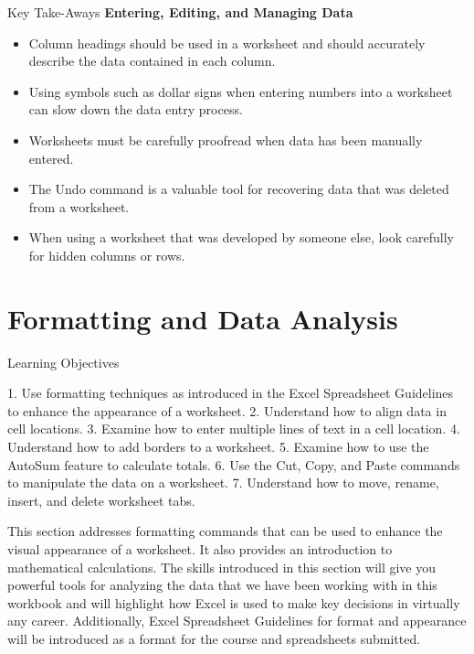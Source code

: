 \begin{center}
	\begin{tkwbox}{Key Take-Aways}
		\textbf{Entering, Editing, and Managing Data}
		\\
		\begin{itemize}
			\setlength{\itemsep}{0pt}
			\setlength{\parskip}{0pt}
			\setlength{\parsep}{0pt}
			
			\item Column headings should be used in a worksheet and should accurately describe the data contained in each column.
			\item Using symbols such as dollar signs when entering numbers into a worksheet can slow down the data entry process.
			\item Worksheets must be carefully proofread when data has been manually entered.
			\item The Undo command is a valuable tool for recovering data that was deleted from a worksheet.
			\item When using a worksheet that was developed by someone else, look carefully for hidden columns or rows.
			
		\end{itemize}
	\end{tkwbox}
\end{center}

\section{Formatting and Data Analysis}


Learning Objectives


1. Use formatting techniques as introduced in the Excel Spreadsheet Guidelines to enhance the appearance
of a worksheet.
2. Understand how to align data in cell locations.
3. Examine how to enter multiple lines of text in a cell location.
4. Understand how to add borders to a worksheet.
5. Examine how to use the AutoSum feature to calculate totals.
6. Use the Cut, Copy, and Paste commands to manipulate the data on a worksheet.
7. Understand how to move, rename, insert, and delete worksheet tabs.



This section addresses formatting commands that can be used to enhance the visual appearance of
a worksheet. It also provides an introduction to mathematical calculations. The skills introduced in
this section will give you powerful tools for analyzing the data that we have been working with in
this workbook and will highlight how Excel is used to make key decisions in virtually any career.
Additionally, Excel Spreadsheet Guidelines for format and appearance will be introduced as a format
for the course and spreadsheets submitted.

